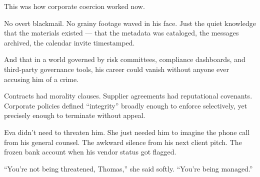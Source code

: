 \medskip

This was how corporate coercion worked now.

No overt blackmail.
No grainy footage waved in his face.
Just the quiet knowledge that the materials existed — that the metadata was cataloged, the messages archived, the calendar invite timestamped.

And that in a world governed by risk committees, compliance dashboards, and third-party governance tools, his career could vanish without anyone ever accusing him of a crime.

Contracts had morality clauses.
Supplier agreements had reputational covenants.
Corporate policies defined “integrity” broadly enough to enforce selectively, yet precisely enough to terminate without appeal.

Eva didn’t need to threaten him.
She just needed him to imagine the phone call from his general counsel.
The awkward silence from his next client pitch.
The frozen bank account when his vendor status got flagged.

“You’re not being threatened, Thomas,” she said softly.  “You’re being managed.”

\medskip

